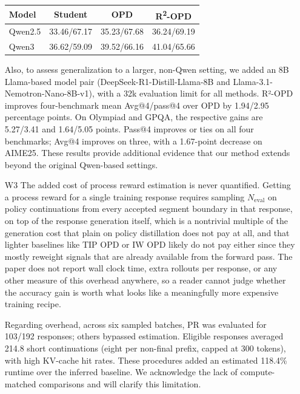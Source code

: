 \begin{enumerate}
\begin{responsebox}[frametitle={Response to W2}]
\begin{center}
\begin{tabular}{lccc}
\hline
Model & Student & OPD & R\textsuperscript{2}-OPD \\
\hline
Qwen2.5 & 33.46/67.17 & 35.23/67.68 & 36.24/69.19 \\
Qwen3 & 36.62/59.09 & 39.52/66.16 & 41.04/65.66 \\
\hline
\end{tabular}
\end{center}

Also, to assess generalization to a larger, non-Qwen setting, we added an 8B Llama-based model pair (DeepSeek-R1-Distill-Llama-8B and Llama-3.1-Nemotron-Nano-8B-v1), with a 32k evaluation limit for all methods. R²-OPD improves four-benchmark mean Avg@4/pass@4 over OPD by 1.94/2.95 percentage points. On Olympiad and GPQA, the respective gains are 5.27/3.41 and 1.64/5.05 points. Pass@4 improves or ties on all four benchmarks; Avg@4 improves on three, with a 1.67-point decrease on AIME25. These results provide additional evidence that our method extends beyond the original Qwen-based settings.



\vspace*{2\baselineskip}
\end{responsebox}

\item[W3] The added cost of process reward estimation is never quantified. Getting a process reward for a single training response requires sampling $N_{\mathrm{eval}}$ on policy continuations from every accepted segment boundary in that response, on top of the response generation itself, which is a nontrivial multiple of the generation cost that plain on policy distillation does not pay at all, and that lighter baselines like TIP OPD or IW OPD likely do not pay either since they mostly reweight signals that are already available from the forward pass. The paper does not report wall clock time, extra rollouts per response, or any other measure of this overhead anywhere, so a reader cannot judge whether the accuracy gain is worth what looks like a meaningfully more expensive training recipe.
\par{}
\begin{responsebox}[frametitle={Response to W3}]
Regarding overhead, across six sampled batches, PR was evaluated for 103/192 responses; others bypassed estimation. Eligible responses averaged 214.8 short continuations (eight per non-final prefix, capped at 300 tokens), with high KV-cache hit rates. These procedures added an estimated 118.4\% runtime over the inferred baseline. We acknowledge the lack of compute-matched comparisons and will clarify this limitation.
\end{responsebox}

\end{enumerate}

